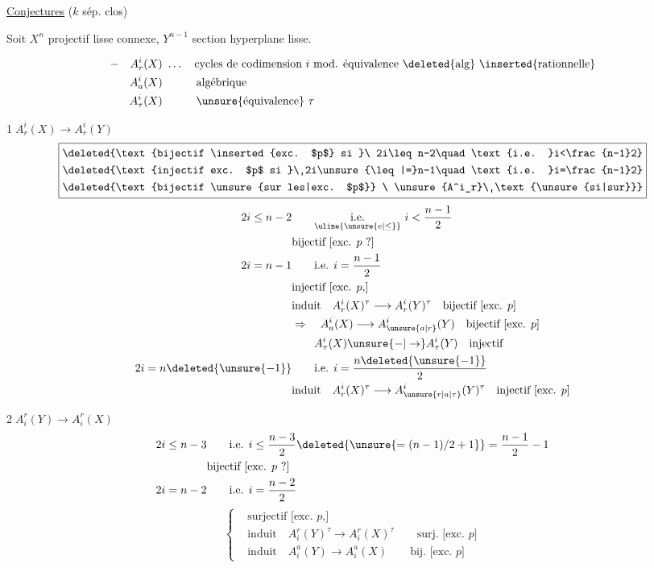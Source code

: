 \uline{Conjectures}  \quad ($k$ sép. clos)

Soit $X^n$ projectif lisse connexe, $Y^{n-1}$ section hyperplane lisse.

\[
\begin{aligned}
 -\quad A^i_r(X)&\ \ldots\quad\text{cycles de codimension $i$ mod. équivalence \deleted{alg} \inserted{rationnelle}}\\
 A^i_a(X)&\hspace{3em}\text{algébrique}\\
 A^i_{\tau}(X)&\hspace{3em}\text{\unsure{équivalence} $\tau$}
\end{aligned}
\]

\textcircled{1}\quad $A^i_r(X)\longrightarrow A^i_r(Y)$
\[
\boxed{\begin{aligned}
 \deleted{\text{bijectif \inserted{exc. $p$} si }\ 2i\leq n-2\quad\text{i.e. }i<\frac{n-1}2}\\
 \deleted{\text{injectif exc. $p$ si }\ 2i\unsure{\leq|=}n-1\quad\text{i.e. }i=\frac{n-1}2}\\
 \deleted{\text{bijectif \unsure{sur les|exc. $p$}} \ \unsure{A^i_r}\ \text{\unsure{si|sur}}}
\end{aligned}}
\]
\[
\begin{aligned}
 2i\leq n-2&\qquad\underset{\uline{\unsure{e|\leq}}}{\text{i.e.}}\  i<\frac{n-1}2\\
 &\text{bijectif [exc. $p$ ?]}\\
 2i=n-1&\qquad\text{i.e. }i=\frac{n-1}2\\
 &\text{injectif [exc. $p$,]}\\
 &\text{induit}\quad A^i_r(X)^\tau\longrightarrow A^i_r(Y)^\tau\quad\text{bijectif [exc. $p$]}\\
 &\Rightarrow\quad A^i_a(X)\longrightarrow A^i_{\unsure{a|r}}(Y)\quad\text{bijectif [exc. $p$]}\\
 &\phantom{\Rightarrow\quad} A^i_\tau(X)\unsure{\mathord{-}|\to}A^i_\tau(Y)\quad\text{injectif}\\
 2i=n\deleted{\unsure{-1}}&\qquad\text{i.e. }i=\frac{n\deleted{\unsure{-1}}}2\\
 &\text{induit}\quad A^i_r(X)^\tau\longrightarrow A^i_{\unsure{r|a|\tau}}(Y)^\tau\quad\text{injectif [exc. $p$]}
\end{aligned}
\]

\textcircled{2}\quad $A^r_i(Y)\longrightarrow A^r_i(X)$
\[
\begin{aligned}
 2i\leq n-3&\qquad\text{i.e. }i\leq\frac{n-3}2\deleted{\unsure{=(n-1)/2+1}}=\frac{n-1}2-1\\
 &\text{bijectif [exc. $p$ ?]}\\
 2i=n-2&\qquad\text{i.e. }i=\frac{n-2}2
\end{aligned}
\]
\[
 \left\{\begin{aligned}
 &\text{surjectif [exc. $p$,]}\\
 &\text{induit}\quad A_i^r(Y)^\tau\longrightarrow A_i^r(X)^\tau\qquad\text{surj. [exc. $p$]}\\
 &\text{induit}\quad A_i^a(Y)\longrightarrow A_i^a(X)\qquad\text{bij. [exc. $p$]}
 \end{aligned}\right.
\]

